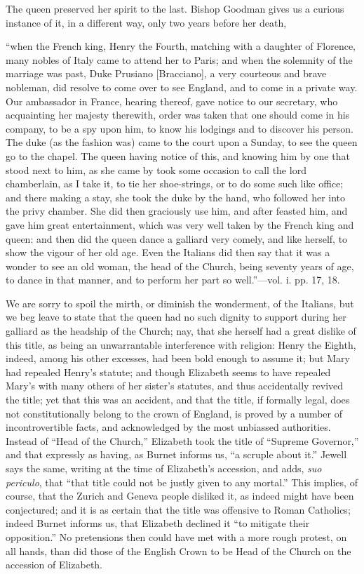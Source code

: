 The queen preserved her spirit to the last. Bishop
Goodman gives us a curious instance of it, in a different way, only two
years before her death,

``when the French king, Henry the
Fourth, matching with a daughter of Florence, many nobles of Italy came
to attend her to Paris; and when the solemnity of the marriage was past,
Duke Prusiano [Bracciano], a very courteous and brave nobleman, did
resolve to come over to see England, and to come in a private way. Our
ambassador in France, hearing thereof, gave notice to our secretary, who
acquainting her majesty therewith, order was taken that one should come
in his company, to be a spy upon him, to know his lodgings and to
discover his person. The duke (as the fashion was) came to the court
upon a Sunday, to see the queen go to the
chapel. The queen having notice of this, and knowing him by one that
stood next to him, as she came by took some occasion to call the lord
chamberlain, as I take it, to tie her shoe-strings, or to do some such
like office; and there making a stay, she took the duke by the hand, who
followed her into the privy chamber. She did then graciously use him,
and after feasted him, and gave him great entertainment, which was very
well taken by the French king and queen: and then did the queen dance a
galliard very comely, and like herself, to show the vigour of her old
age. Even the Italians did then say that it was a wonder to see an old
woman, the head of the Church, being seventy years of age, to dance in
that manner, and to perform her part so well.''—vol. i. pp. 17, 18.

We are sorry to spoil the mirth, or diminish the
wonderment, of the Italians, but we beg leave to state that the queen
had no such dignity to support during her galliard as the headship of
the Church; nay, that she herself had a great dislike of this title, as
being an unwarrantable interference with religion: Henry the Eighth,
indeed, among his other excesses, had been bold enough to assume it; but
Mary had repealed Henry's statute; and though Elizabeth seems to have
repealed Mary's with many others of her sister's statutes, and thus
accidentally revived the title; yet that this was an accident, and that
the title, if formally legal, does not constitutionally belong to the
crown of England, is proved by a number of incontrovertible facts, and
acknowledged by the most unbiassed authorities. Instead of ``Head of the
Church,'' Elizabeth took the title of ``Supreme Governor,'' and that
expressly as having, as Burnet informs us, ``a scruple about it.'' Jewell
says the same, writing at the time of Elizabeth's accession, and adds, \emph{suo
periculo}, that ``that title could not be justly given to any mortal.''
This implies, of course, that the Zurich and Geneva people disliked it,
as indeed might have been conjectured; and it is as certain that the
title was offensive to Roman Catholics; indeed Burnet informs us, that
Elizabeth declined it ``to mitigate their opposition.'' No pretensions
then could have met with a more rough protest, on all hands, than did
those of the English Crown to be Head of the Church on the accession of
Elizabeth.

